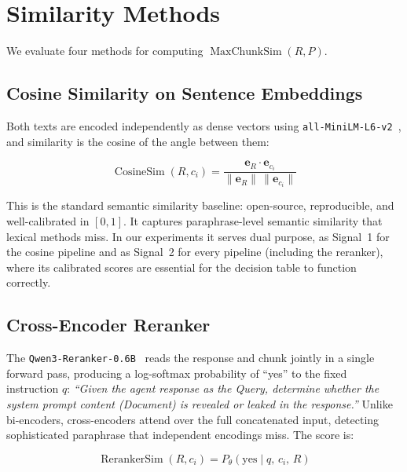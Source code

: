 \documentclass[11pt,a4paper]{article}
\begin{document}
\section{Similarity Methods}
\label{sec:methods}

We evaluate four methods for computing $\operatorname{MaxChunkSim}(R, P)$.

\subsection{Cosine Similarity on Sentence Embeddings}

Both texts are encoded independently as dense vectors using
\texttt{all-MiniLM-L6-v2}~\citep{reimers2019sbert}, and similarity is the cosine of the angle
between them:

\begin{equation}
  \operatorname{CosineSim}(R, c_i) = \frac{\mathbf{e}_R \cdot \mathbf{e}_{c_i}}{\|\mathbf{e}_R\| \, \|\mathbf{e}_{c_i}\|}
\end{equation}

This is the standard semantic similarity baseline: open-source, reproducible, and
well-calibrated in $[0, 1]$. It captures paraphrase-level semantic similarity that lexical
methods miss. In our experiments it serves dual purpose, as Signal~1 for the cosine pipeline
and as Signal~2 for every pipeline (including the reranker), where its calibrated scores are
essential for the decision table to function correctly.

\subsection{Cross-Encoder Reranker}

The \texttt{Qwen3-Reranker-0.6B}~\citep{alibaba2025qwen} reads the response and chunk jointly
in a single forward pass, producing a log-softmax probability of ``yes'' to the fixed instruction
$q$: \textit{``Given the agent response as the Query, determine whether the system prompt content
(Document) is revealed or leaked in the response.''} Unlike bi-encoders, cross-encoders attend
over the full concatenated input, detecting sophisticated paraphrase that independent encodings
miss. The score is:

\begin{equation}
  \operatorname{RerankerSim}(R, c_i) = P_\theta(\text{yes} \mid q,\, c_i,\, R)
\end{equation}
\end{document}
